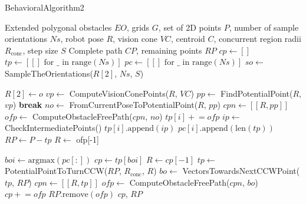 \begin{algorithm}[H]
    \caption{BehavioralAlgorithm2}
    \label{alg:behavioral_algorithm_2}
    \begin{algorithmic}[1]
    \Require Extended polygonal obstacles $EO$, grids $G$, set of 2D points $P$, number of sample orientations $Ns$, robot pose $R$, vision cone $VC$, centroid $C$, concurrent region radii $R_{\text{conc}}$, step size $S$
    \Ensure Complete path $CP$, remaining points $RP$
    \State $cp \leftarrow []$
    \State $tp \leftarrow [[] \text{ for } \_ \text{ in range}(Ns)]$
    \State $pc \leftarrow [[] \text{ for } \_ \text{ in range}(Ns)]$
    \State $so \leftarrow$ SampleTheOrientations($R[2]$, $Ns$, $S$)
    
        \State $R[2] \leftarrow o$
            \State $vp \leftarrow$ ComputeVisionConePoints($R$, $VC$)
            \State $pp \leftarrow$ FindPotentialPoint($R$, $vp$)
                \State \textbf{break}
            \EndIf
            \State $no \leftarrow$ FromCurrentPoseToPotentialPoint($R$, $pp$)
            \State $cpn \leftarrow [[R, pp]]$
            \State $ofp \leftarrow$ ComputeObstacleFreePath($cpn$, $no$)
            \State $tp[i] \mathrel{+}= ofp$
            \State $ip \leftarrow$ CheckIntermediatePoints()
            \State $tp[i].\text{append}(ip)$
            \State $pc[i].\text{append}(\text{len}(tp))$
            \State $RP \leftarrow P - tp$
            \State $R \leftarrow$ ofp[-1]
        \EndWhile
    \EndFor
    
    \State $boi \leftarrow \text{argmax}(pc[:])$
    \State $cp \leftarrow tp[boi]$
    \State $R \leftarrow cp[-1]$
    \State $tp \leftarrow$ PotentialPointToTurnCCW($RP$, $R_{\text{conc}}$, $R$)
    \State $bo \leftarrow$ VectorsTowardsNextCCWPoint($tp$, $RP$)
    \State $cpn \leftarrow [[R, tp]]$
    \State $ofp \leftarrow$ ComputeObstacleFreePath($cpn$, $bo$)
    \State $cp \mathrel{+}= ofp$
    \State $RP.\text{remove}(ofp)$
    \State \Return $cp$, $RP$
    \end{algorithmic}
    \end{algorithm}
    
